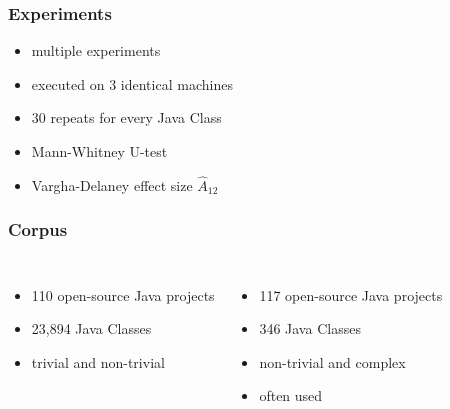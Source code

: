 \begin{frame}
	\frametitle{Experiments}
	
	\begin{itemize}
		\item multiple experiments
		\item executed on 3 identical machines
		\item 30 repeats for every Java Class
		\item Mann-Whitney U-test
		\item Vargha-Delaney effect size $\hat{A}_{12}$
	\end{itemize}
	
\end{frame}

\begin{frame}
	\frametitle{Corpus}
	
	\begin{columns}[c]
		
		\begin{itemize}
			\item 110 open-source Java projects
			\item 23,894 Java Classes
			\item trivial and non-trivial
		\end{itemize}
		
		\begin{itemize}
			\item 117 open-source Java projects
			\item 346 Java Classes
			\item non-trivial and complex
			\item often used
		\end{itemize}

	\end{columns}
	
\end{frame}


